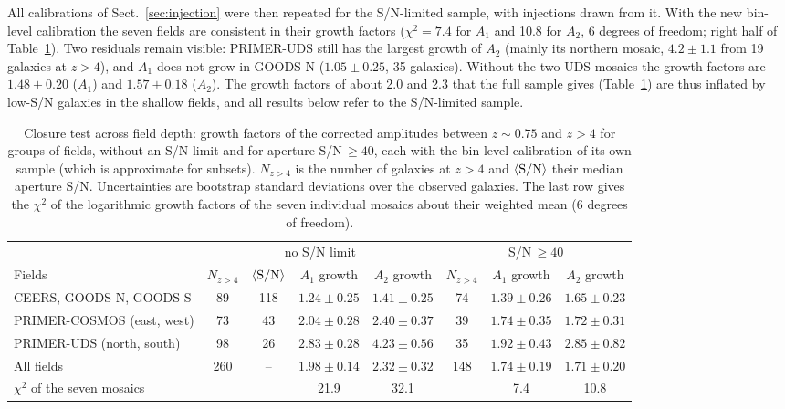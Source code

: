 \documentclass[fleqn,usenatbib]{mnras}
\begin{document}
All calibrations of Sect.~\ref{sec:injection} were then repeated for the
S/N-limited sample, with injections drawn from it. With the new bin-level
calibration the seven fields are consistent in their growth factors
($\chi^2=7.4$ for $A_1$ and 10.8 for $A_2$, 6 degrees of freedom; right half of
Table~\ref{tab:closure}). Two residuals remain visible: PRIMER-UDS still has the
largest growth of $A_2$ (mainly its northern mosaic, $4.2\pm1.1$ from 19 galaxies
at $z>4$), and $A_1$ does not grow in GOODS-N ($1.05\pm0.25$, 35 galaxies).
Without the two UDS mosaics the growth factors are $1.48\pm0.20$ ($A_1$) and
$1.57\pm0.18$ ($A_2$). The growth factors of about 2.0 and 2.3 that the full
sample gives (Table~\ref{tab:closure}) are thus inflated by low-S/N galaxies in
the shallow fields, and all results below refer to the S/N-limited sample.

\begin{table}
\centering
\caption{Closure test across field depth: growth factors of the corrected
amplitudes between $z\sim0.75$ and $z>4$ for groups of fields, without an S/N
limit and for aperture S/N$\,\geq40$, each with the bin-level calibration of its
own sample (which is approximate for subsets). $N_{z>4}$ is the number of
galaxies at $z>4$ and $\langle{\rm S/N}\rangle$ their median aperture S/N.
Uncertainties are bootstrap standard deviations over the observed galaxies. The
last row gives the $\chi^2$ of the logarithmic growth factors of the seven
individual mosaics about their weighted mean (6 degrees of freedom).}
\label{tab:closure}
\small
\begin{tabular}{lccccccc}
\hline
 & \multicolumn{4}{c}{no S/N limit} & \multicolumn{3}{c}{S/N$\,\geq40$}\\
Fields & $N_{z>4}$ & $\langle{\rm S/N}\rangle$ & $A_1$ growth & $A_2$ growth & $N_{z>4}$ & $A_1$ growth & $A_2$ growth\\
\hline
CEERS, GOODS-N, GOODS-S & 89 & 118 & $1.24\pm0.25$ & $1.41\pm0.25$ & 74 & $1.39\pm0.26$ & $1.65\pm0.23$\\
PRIMER-COSMOS (east, west) & 73 & 43 & $2.04\pm0.28$ & $2.40\pm0.37$ & 39 & $1.74\pm0.35$ & $1.72\pm0.31$\\
PRIMER-UDS (north, south) & 98 & 26 & $2.83\pm0.28$ & $4.23\pm0.56$ & 35 & $1.92\pm0.43$ & $2.85\pm0.82$\\
All fields & 260 & -- & $1.98\pm0.14$ & $2.32\pm0.32$ & 148 & $1.74\pm0.19$ & $1.71\pm0.20$\\
\hline
$\chi^2$ of the seven mosaics & & & 21.9 & 32.1 & & 7.4 & 10.8\\
\hline
\end{tabular}
\end{table}
\end{document}
